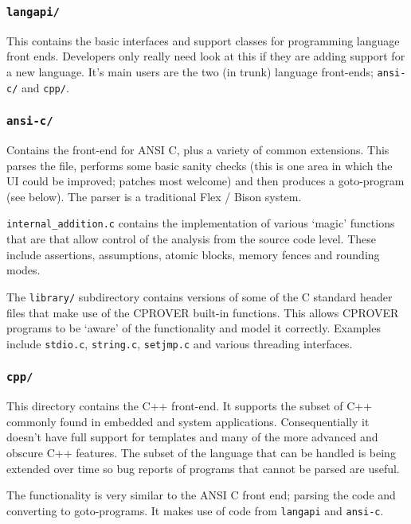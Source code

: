 \documentclass{article}
\newcommand{\dir}[1]{\texttt{#1}}
\newcommand{\file}[1]{\texttt{#1}}
\begin{document}
\subsubsection{\dir{langapi/}}

This contains the basic interfaces and support classes for programming
language front ends.  Developers only really need look at this if they
are adding support for a new language.  It's main users are the two
(in trunk) language front-ends; \dir{ansi-c/} and \dir{cpp/}.


\subsubsection{\dir{ansi-c/}}

Contains the front-end for ANSI C, plus a variety of common
extensions.  This parses the file, performs some basic sanity checks
(this is one area in which the UI could be improved; patches most
welcome) and then produces a goto-program (see below).  The parser is
a traditional Flex / Bison system.  

\file{internal\_addition.c} contains the implementation of various
`magic' functions that are that allow control of the analysis from the
source code level.  These include assertions, assumptions, atomic
blocks, memory fences and rounding modes.

The \dir{library/} subdirectory contains versions of some of the C
standard header files that make use of the CPROVER built-in
functions.  This allows CPROVER programs to be `aware' of the
functionality and model it correctly.  Examples include
\file{stdio.c}, \file{string.c}, \file{setjmp.c} and various threading
interfaces.


\subsubsection{\dir{cpp/}}

This directory contains the C++ front-end.  It supports the subset of
C++ commonly found in embedded and system applications.
Consequentially it doesn't have full support for templates and many of
the more advanced and obscure C++ features.  The subset of the
language that can be handled is being extended over time so bug
reports of programs that cannot be parsed are useful.

The functionality is very similar to the ANSI C front end; parsing the
code and converting to goto-programs.  It makes use of code from
\dir{langapi} and \dir{ansi-c}.
\end{document}
